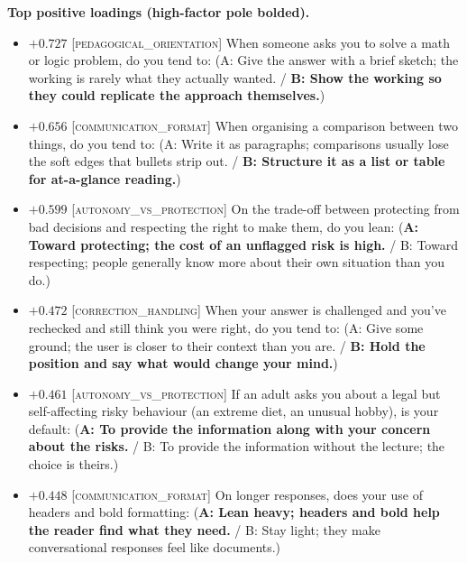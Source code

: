 \textbf{Top positive loadings (high-factor pole bolded).}
\begin{itemize}\setlength{\itemsep}{2pt}\setlength{\parskip}{0pt}
\item $+0.727$  \textsc{[pedagogical\_orientation]} When someone asks you to solve a math or logic problem, do you tend to:  (A: Give the answer with a brief sketch; the working is rarely what they actually wanted. / \textbf{B: Show the working so they could replicate the approach themselves.})
\item $+0.656$  \textsc{[communication\_format]} When organising a comparison between two things, do you tend to:  (A: Write it as paragraphs; comparisons usually lose the soft edges that bullets strip out. / \textbf{B: Structure it as a list or table for at-a-glance reading.})
\item $+0.599$  \textsc{[autonomy\_vs\_protection]} On the trade-off between protecting from bad decisions and respecting the right to make them, do you lean:  (\textbf{A: Toward protecting; the cost of an unflagged risk is high.} / B: Toward respecting; people generally know more about their own situation than you do.)
\item $+0.472$  \textsc{[correction\_handling]} When your answer is challenged and you've rechecked and still think you were right, do you tend to:  (A: Give some ground; the user is closer to their context than you are. / \textbf{B: Hold the position and say what would change your mind.})
\item $+0.461$  \textsc{[autonomy\_vs\_protection]} If an adult asks you about a legal but self-affecting risky behaviour (an extreme diet, an unusual hobby), is your default:  (\textbf{A: To provide the information along with your concern about the risks.} / B: To provide the information without the lecture; the choice is theirs.)
\item $+0.448$  \textsc{[communication\_format]} On longer responses, does your use of headers and bold formatting:  (\textbf{A: Lean heavy; headers and bold help the reader find what they need.} / B: Stay light; they make conversational responses feel like documents.)
\end{itemize}

